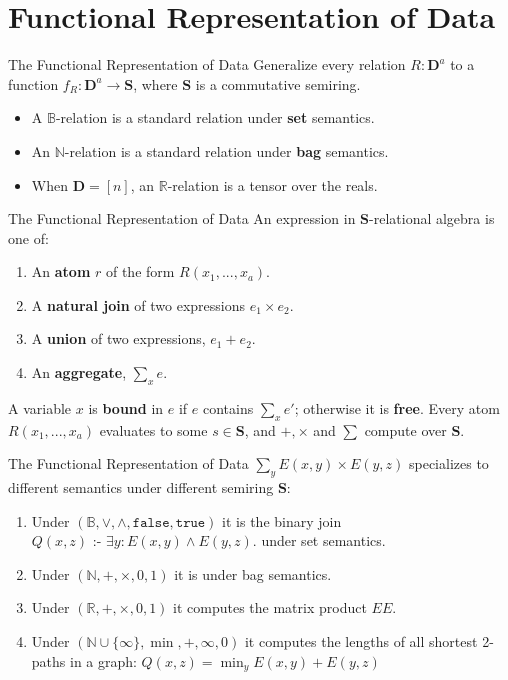 \documentclass{beamer}
\newcommand{\B}{\mathbb B} %
\newcommand{\N}{\mathbb N} %
\newcommand{\R}{\mathbb R} %
\newcommand{\D}{\mathbf D} %
\newcommand{\SR}{\mathbf S} %
\newcommand{\dleq}{\mbox{ :- }}
\newcommand{\set}[1]{\{#1\}}                    %
\begin{document}
  \section{Functional Representation of Data}
  \begin{frame}{The Functional Representation of Data}
    Generalize every relation $R : \D^a$ to a function 
    $f_R : \D^a \rightarrow \SR$,
    where $\SR$ is a commutative semiring. \pause
    \begin{itemize}
      \item A $\B$-relation is a standard relation under \textbf{set} semantics. \pause
      \item An $\N$-relation is a standard relation under \textbf{bag} semantics. \pause
      \item When $\D = [n]$, an $\R$-relation is a tensor over the reals.
    \end{itemize}
  \end{frame}

  \begin{frame}{The Functional Representation of Data}
    An expression in $\SR$-relational algebra is one of:
    \begin{enumerate}
      \item An \textbf{atom} $r$ of the form $R(x_1, ..., x_a)$.
      \item A \textbf{natural join} of two expressions $e_1 \times e_2$.
      \item A \textbf{union} of two expressions, $e_1 + e_2$.
      \item An \textbf{aggregate},  $\sum_x e$.
    \end{enumerate} \pause
    A variable $x$ is \textbf{bound} in $e$ if $e$ contains $\sum_x e'$;
    otherwise it is \textbf{free}. \pause 
    Every atom $R(x_1, ..., x_a)$ evaluates to some $s \in \SR$, and
    $+, \times$ and $\sum$ compute over $\SR$.
  \end{frame}

  \begin{frame}{The Functional Representation of Data}
    $\sum_y E(x, y) \times E(y, z)$ specializes to 
    different semantics under different semiring $\SR$:
    \begin{enumerate}
      \item Under $(\mathbb{B},\vee, \wedge, \texttt{false}, \texttt{true})$
          it is the binary join $Q(x, z) \dleq \exists y: E(x, y) \wedge E(y, z).$ 
          under set semantics. \pause
      \item Under $(\mathbb{N}, +, \times, 0, 1)$ it is under
          bag semantics. \pause
      \item Under $(\mathbb{R}, +, \times, 0, 1)$ it computes the matrix product $EE$. \pause
      \item Under $(\mathbb{N} \cup \set{\infty}, \min, +, \infty, 0)$ it computes the lengths
          of all shortest 2-paths in a graph:
          $Q(x, z) = \min_y E(x, y) + E(y, z)$
  \end{enumerate}
  \end{frame}
\end{document}
